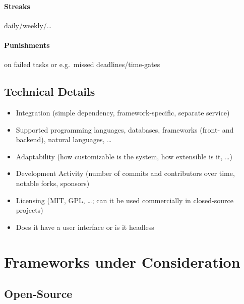 \documentclass[runningheads]{llncs}
\begin{document}
\paragraph{Streaks} daily/weekly/\ldots

\paragraph{Punishments} on failed tasks or e.g.~missed deadlines/time-gates

\subsection{Technical Details}

\begin{itemize}
    \item Integration (simple dependency, framework-specific, separate service)
    \item Supported programming languages, databases, frameworks (front- and backend), natural languages, \ldots
    \item Adaptability (how customizable is the system, how extensible is it, \ldots)
    \item Development Activity (number of commits and contributors over time, notable forks, sponsors)
    \item Licensing (MIT, GPL, \ldots; can it be used commercially in closed-source projects)
    \item Does it have a user interface or is it headless
\end{itemize}

\section{Frameworks under Consideration}

\subsection{Open-Source}
\end{document}
